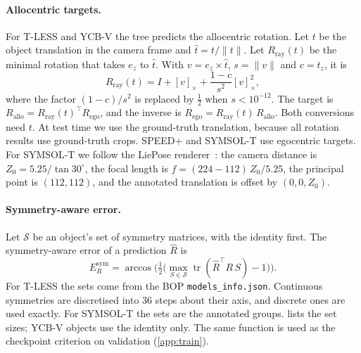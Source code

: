 \paragraph{Allocentric targets.}
For T-LESS and YCB-V the tree predicts the allocentric rotation. Let $t$ be the object translation in the camera frame and $\hat t=t/\|t\|$. Let $R_{\text{ray}}(t)$ be the minimal rotation that takes $e_z$ to $\hat t$. With $v=e_z\times\hat t$, $s=\|v\|$ and $c=\hat t_z$, it is
\begin{equation}
  R_{\text{ray}}(t)=I+[v]_\times+\frac{1-c}{s^2}[v]_\times^2,
\end{equation}
where the factor $(1-c)/s^2$ is replaced by $\tfrac12$ when $s<10^{-12}$. The target is $R_{\text{allo}}=R_{\text{ray}}(t)^\top R_{\text{ego}}$, and the inverse is $R_{\text{ego}}=R_{\text{ray}}(t)\,R_{\text{allo}}$. Both conversions need $t$. At test time we use the ground-truth translation, because all rotation results use ground-truth crops. SPEED+ and SYMSOL-T use egocentric targets. For SYMSOL-T we follow the LiePose renderer~\cite{hsiao2024liepose}: the camera distance is $Z_0=5.25/\tan 30^\circ$, the focal length is $f=(224-112)\,Z_0/5.25$, the principal point is $(112,112)$, and the annotated translation is offset by $(0,0,Z_0)$.

\paragraph{Symmetry-aware error.}
Let $\mathcal{S}$ be an object's set of symmetry matrices, with the identity first. The symmetry-aware error of a prediction $\hat R$ is
\begin{equation}
  E_R^{\text{sym}}=\arccos\!\Big(\tfrac12\big(\max_{S\in\mathcal{S}}\operatorname{tr}(\hat R^\top R\,S)-1\big)\Big).
\end{equation}
For T-LESS the sets come from the BOP \texttt{models\_info.json}. Continuous symmetries are discretised into 36 steps about their axis, and discrete ones are used exactly. For SYMSOL-T the sets are the annotated groups.  lists the set sizes; YCB-V objects use the identity only. The same function is used as the checkpoint criterion on validation (\cref{app:train}).

